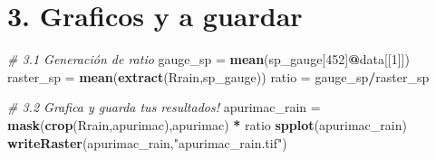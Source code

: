 \documentclass[]{article}
\newenvironment{Shaded}{\begin{snugshade}}{\end{snugshade}}
\newcommand{\KeywordTok}[1]{\textcolor[rgb]{0.13,0.29,0.53}{\textbf{#1}}}
\newcommand{\DecValTok}[1]{\textcolor[rgb]{0.00,0.00,0.81}{#1}}
\newcommand{\StringTok}[1]{\textcolor[rgb]{0.31,0.60,0.02}{#1}}
\newcommand{\CommentTok}[1]{\textcolor[rgb]{0.56,0.35,0.01}{\textit{#1}}}
\newcommand{\OperatorTok}[1]{\textcolor[rgb]{0.81,0.36,0.00}{\textbf{#1}}}
\newcommand{\NormalTok}[1]{#1}
\begin{document}
\section{3. Graficos y a guardar}\label{graficos-y-a-guardar}

\begin{Shaded}
\begin{Highlighting}[]
\CommentTok{# 3.1 Generación de ratio}
\NormalTok{gauge_sp =}\StringTok{ }\KeywordTok{mean}\NormalTok{(sp_gauge[}\DecValTok{452}\NormalTok{]}\OperatorTok{@}\NormalTok{data[[}\DecValTok{1}\NormalTok{]])}
\NormalTok{raster_sp =}\StringTok{ }\KeywordTok{mean}\NormalTok{(}\KeywordTok{extract}\NormalTok{(Rrain,sp_gauge))}
\NormalTok{ratio =}\StringTok{ }\NormalTok{gauge_sp}\OperatorTok{/}\NormalTok{raster_sp}

\CommentTok{# 3.2 Grafica y guarda tus resultados!}
\NormalTok{apurimac_rain =}\StringTok{ }\KeywordTok{mask}\NormalTok{(}\KeywordTok{crop}\NormalTok{(Rrain,apurimac),apurimac) }\OperatorTok{*}\StringTok{ }\NormalTok{ratio}
\KeywordTok{spplot}\NormalTok{(apurimac_rain)}
\KeywordTok{writeRaster}\NormalTok{(apurimac_rain,}\StringTok{"apurimac_rain.tif"}\NormalTok{)}
\end{Highlighting}
\end{Shaded}
\end{document}
